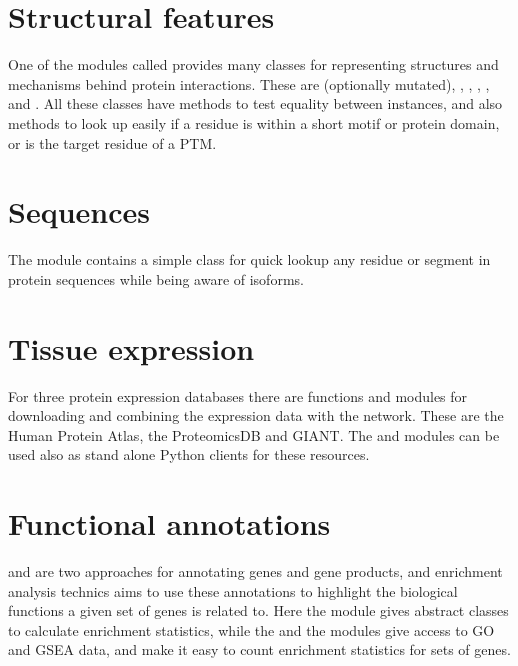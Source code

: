 \documentclass[letterpaper,10pt,english]{sphinxmanual}
\begin{document}
\section{Structural features}
\label{\detokenize{index:structural-features}}
One of the modules called  provides many classes for representing
structures and mechanisms behind protein interactions. These are 
(optionally mutated), , , , ,
 and . All these classes have 
methods to test equality between instances, and also 
methods to look up easily if a residue is within a short motif or protein
domain, or is the target residue of a PTM.


\section{Sequences}
\label{\detokenize{index:sequences}}
The module  contains a simple class for quick lookup any residue or
segment in  protein sequences while being aware of isoforms.


\section{Tissue expression}
\label{\detokenize{index:tissue-expression}}
For three protein expression databases there are functions and modules for
downloading and combining the expression data with the network. These are the
Human Protein Atlas, the ProteomicsDB and GIANT. The  and
 modules can be used also as stand alone Python clients for
these resources.


\section{Functional annotations}
\label{\detokenize{index:functional-annotations}}
 and  are two approaches for annotating genes and
gene products, and enrichment analysis technics aims to use these annotations
to highlight the biological functions a given set of genes is related to. Here
the  module gives abstract classes to calculate enrichment
statistics, while the  and the  modules give access to GO and
GSEA data, and make it easy to count enrichment statistics for sets of genes.
\end{document}
